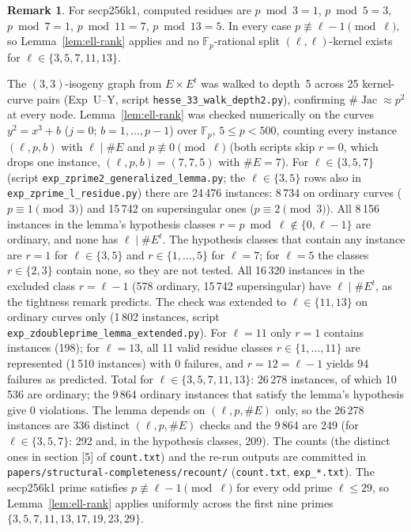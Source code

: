 \documentclass[11pt,a4paper]{article}
\theoremstyle{definition}
\newtheorem{remark}[theorem]{Remark}
\newcommand{\FF}{\mathbb{F}}
\newcommand{\Jac}{\operatorname{Jac}}
\begin{document}
\begin{remark}
\begin{sloppypar}
For secp256k1, computed residues are $p \bmod 3 = 1$, $p \bmod 5 = 3$,
$p \bmod 7 = 1$, $p \bmod 11 = 7$, $p \bmod 13 = 5$.  In every case
$p \not\equiv \ell{-}1 \pmod\ell$, so Lemma~\ref{lem:ell-rank} applies
and no $\FF_p$-rational split $(\ell,\ell)$-kernel exists for
$\ell \in \{3,5,7,11,13\}$.
\end{sloppypar}
The $(3,3)$-isogeny graph from $E \times E^t$ was walked to depth~5
across 25 kernel-curve pairs (Exp~U--Y, script
\texttt{hesse\_33\_walk\_depth2.py}),
confirming $\#\Jac \approx p^2$ at every node.
Lemma~\ref{lem:ell-rank} was checked numerically on the curves
$y^2 = x^3 + b$ ($j = 0$; $b = 1,\ldots,p{-}1$) over $\FF_p$, $5 \le p < 500$,
counting every instance $(\ell, p, b)$ with $\ell \mid \#E$ and
$p \not\equiv 0 \pmod \ell$ (both scripts skip $r = 0$, which drops one
instance, $(\ell,p,b) = (7,7,5)$ with $\#E = 7$).
For $\ell \in \{3,5,7\}$
(script \texttt{exp\_zprime2\_generalized\_lemma.py}; the $\ell \in \{3,5\}$
rows also in \texttt{exp\_zprime\_l\_residue.py}) there are 24\,476
instances: 8\,734 on ordinary curves ($p \equiv 1 \pmod 3$) and 15\,742 on
supersingular ones ($p \equiv 2 \pmod 3$).  All 8\,156 instances in the
lemma's hypothesis classes $r = p \bmod \ell \notin \{0, \ell{-}1\}$ are
ordinary, and none has $\ell \mid \#E^t$.  The hypothesis classes that
contain any instance are $r = 1$ for $\ell \in \{3,5\}$ and
$r \in \{1,\ldots,5\}$ for $\ell = 7$; for $\ell = 5$ the classes $r \in \{2,3\}$ contain none, so
they are not tested.  All 16\,320 instances in the excluded class
$r = \ell{-}1$ (578 ordinary, 15\,742 supersingular) have $\ell \mid \#E^t$,
as the tightness remark predicts.
The check was extended to $\ell \in \{11,13\}$ on ordinary curves only
(1\,802 instances, script \texttt{exp\_zdoubleprime\_lemma\_extended.py}).
For $\ell = 11$ only $r = 1$ contains instances (198); for $\ell = 13$, all
11 valid residue classes $r \in \{1,\ldots,11\}$ are represented
(1\,510 instances) with $0$ failures, and $r = 12 = \ell{-}1$ yields 94
failures as predicted.  Total for $\ell \in \{3,5,7,11,13\}$: 26\,278
instances, of which 10\,536 are ordinary; the 9\,864 ordinary instances that
satisfy the lemma's hypothesis give $0$ violations.  The lemma depends on
$(\ell, p, \#E)$ only, so the 26\,278 instances are 336 distinct
$(\ell, p, \#E)$ checks and the 9\,864 are 249 (for
$\ell \in \{3,5,7\}$: 292 and, in the hypothesis classes, 209).  The
counts (the distinct ones in section [5] of \texttt{count.txt}) and the
re-run outputs are committed in
\texttt{papers/structural-completeness/recount/}
(\texttt{count.txt}, \texttt{exp\_*.txt}).
The secp256k1 prime satisfies $p \not\equiv \ell{-}1 \pmod{\ell}$ for every
odd prime $\ell \leq 29$, so Lemma~\ref{lem:ell-rank} applies uniformly
across the first nine primes $\{3,5,7,11,13,17,19,23,29\}$.
\end{remark}
\end{document}
